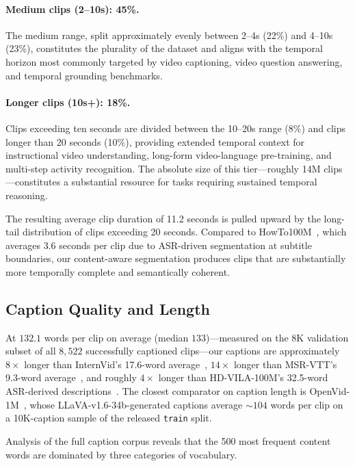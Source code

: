 \documentclass{article}
\begin{document}
\paragraph{Medium clips (2--10s): 45\%.}
The medium range, split approximately evenly between 2--4s (22\%) and 4--10s (23\%), constitutes the plurality of the dataset and aligns with the temporal horizon most commonly targeted by video captioning, video question answering, and temporal grounding benchmarks.

\paragraph{Longer clips (10s+): 18\%.}
Clips exceeding ten seconds are divided between the 10--20s range (8\%) and clips longer than 20 seconds (10\%), providing extended temporal context for instructional video understanding, long-form video-language pre-training, and multi-step activity recognition. The absolute size of this tier---roughly 14M clips---constitutes a substantial resource for tasks requiring sustained temporal reasoning.

The resulting average clip duration of 11.2 seconds is pulled upward by the long-tail distribution of clips exceeding 20 seconds. Compared to HowTo100M~\cite{miech2019howto100m}, which averages 3.6 seconds per clip due to ASR-driven segmentation at subtitle boundaries, our content-aware segmentation produces clips that are substantially more temporally complete and semantically coherent.

\subsection{Caption Quality and Length}

At $132.1$ words per clip on average (median $133$)---measured on the 8K validation subset of all $8{,}522$ successfully captioned clips---our captions are approximately $8\times$ longer than InternVid's 17.6-word average~\cite{wang2024internvid}, $14\times$ longer than MSR-VTT's 9.3-word average~\cite{xu2016msrvtt}, and roughly $4\times$ longer than HD-VILA-100M's 32.5-word ASR-derived descriptions~\cite{xue2022hdvila}. The closest comparator on caption length is OpenVid-1M~\cite{nan2024openvid}, whose LLaVA-v1.6-34b-generated captions average ${\sim}104$ words per clip on a 10K-caption sample of the released \texttt{train} split.

Analysis of the full caption corpus reveals that the 500 most frequent content words are dominated by three categories of vocabulary.
\end{document}
